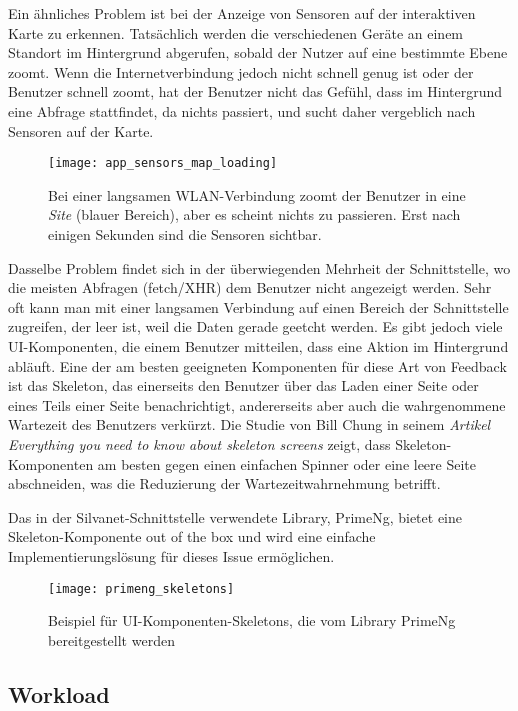 Ein ähnliches Problem ist bei der Anzeige von Sensoren auf der interaktiven Karte zu erkennen.
Tatsächlich werden die verschiedenen Geräte an einem Standort im Hintergrund abgerufen, sobald der Nutzer auf eine bestimmte Ebene zoomt.
Wenn die Internetverbindung jedoch nicht schnell genug ist oder der Benutzer schnell zoomt, hat der Benutzer nicht das Gefühl, dass im Hintergrund eine Abfrage stattfindet, da nichts passiert, und sucht daher vergeblich nach Sensoren auf der Karte.

\begin{figure}[H]
  \centering
  \texttt{[image: app\_sensors\_map\_loading]}
  \caption{Bei einer langsamen WLAN-Verbindung zoomt der Benutzer in eine \textit{Site} (blauer Bereich), aber es scheint nichts zu passieren. Erst nach einigen Sekunden sind die Sensoren sichtbar.}
  \label{fig:app_sensors_map_loading}
\end{figure}

Dasselbe Problem findet sich in der überwiegenden Mehrheit der Schnittstelle, wo die meisten Abfragen (fetch/\ac{XHR}) dem Benutzer nicht angezeigt werden.
Sehr oft kann man mit einer langsamen Verbindung auf einen Bereich der Schnittstelle zugreifen, der leer ist, weil die Daten gerade geetcht werden.
Es gibt jedoch viele \ac{UI}-Komponenten, die einem Benutzer mitteilen, dass eine Aktion im Hintergrund abläuft.
Eine der am besten geeigneten Komponenten für diese Art von Feedback ist das Skeleton, das einerseits den Benutzer über das Laden einer Seite oder eines Teils einer Seite benachrichtigt, andererseits aber auch die wahrgenommene Wartezeit des Benutzers verkürzt.
Die Studie von Bill Chung in seinem \textit{Artikel Everything you need to know about skeleton screens}\cite{skeletonScreens} zeigt, dass Skeleton-Komponenten am besten gegen einen einfachen Spinner oder eine leere Seite abschneiden, was die Reduzierung der Wartezeitwahrnehmung betrifft.

Das in der Silvanet-Schnittstelle verwendete Library, PrimeNg, bietet eine Skeleton-Komponente out of the box und wird eine einfache Implementierungslösung für dieses Issue ermöglichen.

\begin{figure}[H]
  \centering
  \texttt{[image: primeng\_skeletons]}
  \caption{Beispiel für \ac{UI}-Komponenten-Skeletons, die vom Library PrimeNg bereitgestellt werden}
  \label{fig:primeng_skeletons}
\end{figure}

\subsection{Workload} \label{sec:workload}

